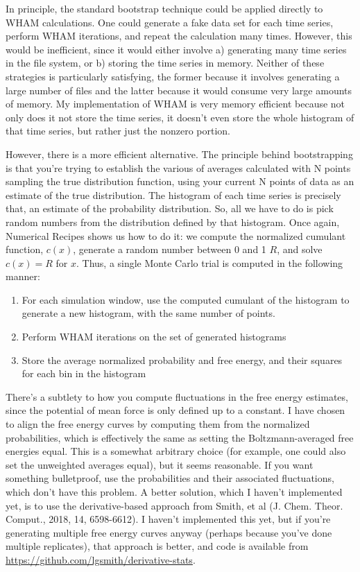 \documentclass[12pt]{article}
\begin{document}
In principle, the standard bootstrap technique could be applied directly to
WHAM calculations.  One could generate a fake data set for each time
series, perform WHAM iterations, and repeat the calculation many times.
However, this would be inefficient, since it would either involve a)
generating many time series in the file system, or b) storing the time
series in memory.  Neither of these strategies is particularly satisfying,
the former because it involves generating a large number of files and the
latter because it would consume very large amounts of memory.
My implementation of WHAM is very memory efficient because not only does it
not store the time series, it doesn't even store the whole histogram of
that time series, but rather just the nonzero portion.

However, there is a more efficient alternative.  The principle behind
bootstrapping is that you're trying to establish the various of averages
calculated with N points sampling the true distribution function, using
your current N points of data as an estimate of the true distribution.
The histogram of each time series is precisely that, an estimate of the
probability distribution.  So, all we have to do is pick random numbers
from the distribution defined by that histogram.  Once again, Numerical
Recipes shows us how to do it: we compute the normalized cumulant function,
$c(x)$, generate a random number between 0 and 1 $R$, and solve $c(x) = R$
for $x$.  Thus, a single Monte Carlo trial is computed in the following manner:

\begin{enumerate}

\item For each simulation window, use the computed cumulant of the histogram
to generate a new histogram, with the same number of points.

\item Perform WHAM iterations on the set of generated histograms

\item Store the average normalized probability and free energy, and their
squares for each bin in the histogram
\end{enumerate}

There's a subtlety to how you compute fluctuations in the free energy estimates,
since the potential of mean force is only defined up to a constant.  I have
chosen to align the free energy curves by computing them from the normalized
probabilities, which is effectively the same as setting the Boltzmann-averaged
free energies equal.  This is a somewhat arbitrary choice (for example, one
could also set the unweighted averages equal), but it seems reasonable.  If you
want something bulletproof, use the probabilities and their associated
fluctuations, which don't have this problem. A better solution, which I haven't
implemented yet, is to use the derivative-based approach from Smith, et al (J.
Chem. Theor. Comput., 2018, 14, 6598-6612). I haven't implemented this yet, but
if you're generating multiple free energy curves anyway (perhaps because you've
done multiple replicates), that approach is better, and code is available from
\url{https://github.com/lgsmith/derivative-stats}.
\end{document}
